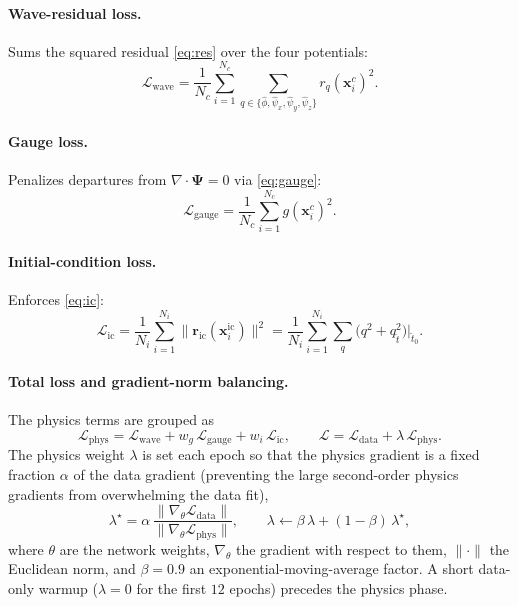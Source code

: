 \documentclass[11pt]{article}
\newcommand{\tht}{\hat{t}}
\newcommand{\phih}{\hat{\phi}} \newcommand{\psih}{\hat{\psi}}
\begin{document}
\paragraph{Wave-residual loss.} Sums the squared residual \eqref{eq:res} over the
four potentials:
\begin{equation}
\mathcal{L}_{\mathrm{wave}}=\frac{1}{N_c}\sum_{i=1}^{N_c}\sum_{q\in\{\phih,\psih_x,\psih_y,\psih_z\}} r_q(\mathbf{x}^c_i)^2 .
\end{equation}

\paragraph{Gauge loss.} Penalizes departures from $\nabla\!\cdot\!\boldsymbol{\Psi}=0$ via \eqref{eq:gauge}:
\begin{equation}
\mathcal{L}_{\mathrm{gauge}}=\frac{1}{N_c}\sum_{i=1}^{N_c} g(\mathbf{x}^c_i)^2 .
\end{equation}

\paragraph{Initial-condition loss.} Enforces \eqref{eq:ic}:
\begin{equation}
\mathcal{L}_{\mathrm{ic}}=\frac{1}{N_i}\sum_{i=1}^{N_i}\big\lVert \mathbf{r}_{\mathrm{ic}}(\mathbf{x}^{\mathrm{ic}}_i)\big\rVert^2
=\frac{1}{N_i}\sum_{i=1}^{N_i}\sum_{q}\Big(q^2+q_{\tht}^2\Big)\Big|_{\tht_0}.
\end{equation}

\paragraph{Total loss and gradient-norm balancing.} The physics terms are grouped as
\begin{equation}
\mathcal{L}_{\mathrm{phys}}=\mathcal{L}_{\mathrm{wave}}+w_g\,\mathcal{L}_{\mathrm{gauge}}+w_i\,\mathcal{L}_{\mathrm{ic}},
\qquad
\mathcal{L}=\mathcal{L}_{\mathrm{data}}+\lambda\,\mathcal{L}_{\mathrm{phys}}.
\end{equation}
The physics weight $\lambda$ is set each epoch so that the physics gradient is a
fixed fraction $\alpha$ of the data gradient (preventing the large second-order
physics gradients from overwhelming the data fit),
\begin{equation}
\lambda^{\star}=\alpha\,\frac{\big\lVert\nabla_\theta\mathcal{L}_{\mathrm{data}}\big\rVert}
{\big\lVert\nabla_\theta\mathcal{L}_{\mathrm{phys}}\big\rVert},
\qquad
\lambda\leftarrow\beta\,\lambda+(1-\beta)\,\lambda^{\star},
\end{equation}
where $\theta$ are the network weights, $\nabla_\theta$ the gradient with respect
to them, $\lVert\cdot\rVert$ the Euclidean norm, and $\beta=0.9$ an
exponential-moving-average factor. A short data-only warmup ($\lambda=0$ for the
first $12$ epochs) precedes the physics phase.
\end{document}
